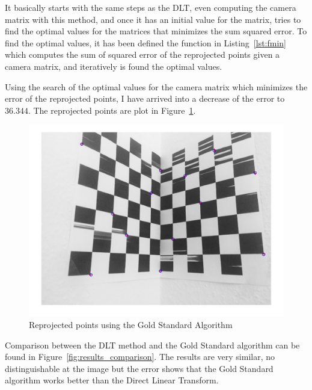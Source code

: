 \documentclass{ethz_report}
\begin{document}
It basically starts with the same steps as the DLT, even computing the camera matrix with this method, and once it has an initial value for the matrix, tries to find the optimal values for the matrices that minimizes the sum squared error.
To find the optimal values, it has been defined the function in Listing~\ref{lst:fmin} which computes the sum of squared error of the reprojected points given a camera matrix, and iteratively is found the optimal values.



Using the search of the optimal values for the camera matrix which minimizes the error of the reprojected points, I have arrived into a decrease of the error to $36.344$.
The reprojected points are plot in Figure~\ref{fig:results_gold}.

\begin{figure}[H]
\centering
\includegraphics[width=.9\linewidth]{images/GoldStd_reprojected}
\caption{Reprojected points using the Gold Standard Algorithm}
\label{fig:results_gold}
\end{figure}

Comparison between the DLT method and the Gold Standard algorithm can be found in Figure~\ref{fig:results_comparison}. The results are very similar, no distinguishable at the image but the error shows that the Gold Standard algorithm works better than the Direct Linear Transform.
\end{document}
